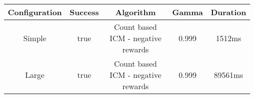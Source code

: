 \begin{tabular}{|c|c|c|c|c|}
\hline
Configuration & Success & Algorithm & Gamma & Duration\\
\hline
Simple & true & Count based ICM - negative rewards & 0.999 & 1512ms\\
Large & true & Count based ICM - negative rewards & 0.999 & 89561ms\\
\hline
\end{tabular}
